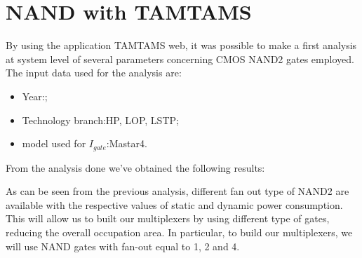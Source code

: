 \section{NAND with TAMTAMS}
By using the application TAMTAMS web, it was possible to make a first analysis at system level of several parameters concerning CMOS NAND2 gates employed.  The input data used for the analysis are:
\begin{itemize}
	\item Year:;
	\item Technology branch:\quad HP, LOP, LSTP;
	\item model used for $I_{gate}$:\quad Mastar4.
\end{itemize}
From the analysis done we've obtained the following results:
	
As can be seen from the previous analysis, different fan out type of NAND2 are available with the respective values of static and dynamic power consumption. This will allow us to built our multiplexers by using different type of gates, reducing the overall occupation area. In particular, to build our multiplexers, we will use NAND gates with fan-out equal to 1, 2 and 4. 

